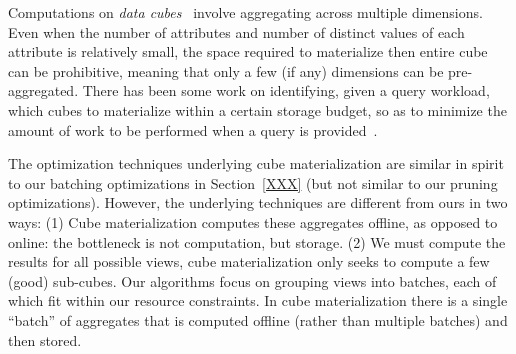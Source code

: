 Computations on {\em data cubes}~\cite{DBLP:jounral/DMKD/GrayCBLR97}
involve aggregating across multiple dimensions.
Even when the number of attributes and number
of distinct values of each attribute is relatively small,
the space required to materialize then entire cube can be prohibitive,
meaning that only a few (if any) dimensions can be pre-aggregated.
There has been some work on identifying, given a query workload,
which cubes to materialize within a certain storage budget,
so as to minimize the amount of work to be performed when a
query is provided~\cite{DBLP:conf/VLDB/AgarwalADG96,DBLP:conf/SIGMOD/HarinarayanRU96}.

The optimization techniques underlying cube materialization 
are similar in spirit to our batching optimizations in Section~\ref{XXX}
(but not similar to our pruning optimizations).
However, the underlying techniques are different from ours in two ways:
(1) Cube materialization computes
 these aggregates offline, as opposed to online: the bottleneck
is not computation, but storage.
(2) We must compute the results for
all possible views, cube materialization only seeks 
to compute a few (good) sub-cubes. Our algorithms focus on
grouping views into batches,
each of which fit within our resource constraints. 
In cube materialization there is a single ``batch'' of aggregates
that is computed offline (rather than multiple batches) and then stored.


